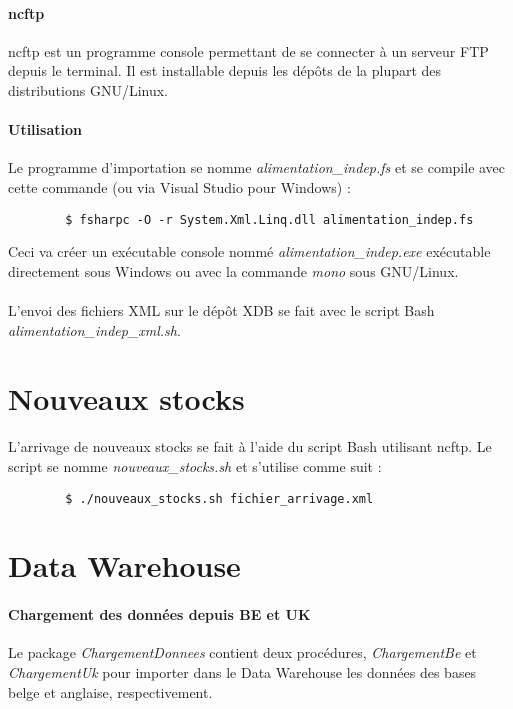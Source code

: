 \documentclass[a4paper,12pt,french]{article}
\begin{document}
    \paragraph{ncftp}
    ncftp est un programme console permettant de se connecter à un serveur FTP
depuis le terminal. Il est installable depuis les dépôts de la plupart des
distributions GNU/Linux.

    \paragraph{Utilisation}
    Le programme d'importation se nomme \textit{alimentation\_indep.fs} et se
compile avec cette commande (ou via Visual Studio pour Windows) :
    \begin{lstlisting}
        $ fsharpc -O -r System.Xml.Linq.dll alimentation_indep.fs
    \end{lstlisting}
    Ceci va créer un exécutable console nommé \textit{alimentation\_indep.exe}
exécutable directement sous Windows ou avec la commande \textit{mono} sous
GNU/Linux.

    \paragraph{}
    L'envoi des fichiers XML sur le dépôt XDB se fait avec le script Bash
\textit{alimentation\_indep\_xml.sh}.

\section{Nouveaux stocks}
    
    L'arrivage de nouveaux stocks se fait à l'aide du script Bash utilisant
ncftp. Le script se nomme \textit{nouveaux\_stocks.sh} et s'utilise comme suit :
    \begin{lstlisting}
        $ ./nouveaux_stocks.sh fichier_arrivage.xml
    \end{lstlisting}

\section{Data Warehouse}

    \paragraph{Chargement des données depuis BE et UK}
    Le package \textit{ChargementDonnees} contient deux procédures,
\textit{ChargementBe} et \textit{ChargementUk} pour importer dans le Data
Warehouse les données des bases belge et anglaise, respectivement.
\end{document}
